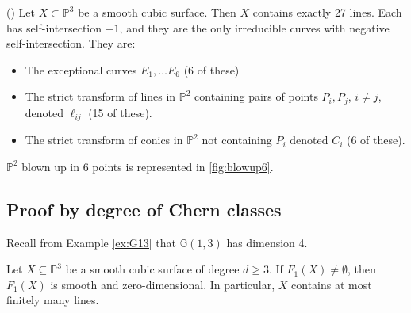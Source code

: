 \begin{proposition}\label{prop:27}
    () Let $X \subset \mathbb{P}^3$ be a smooth cubic surface. Then $X$ contains exactly 27 lines. Each has self-intersection $-1$, and they are the only irreducible curves with negative self-intersection. They are:
    \begin{itemize}
        \item The exceptional curves $E_1, \dots E_6$ (6 of these)
        \item The strict transform of lines in $\mathbb{P}^2$ containing pairs of points $P_i, P_j$, $i \neq j$, denoted $\ell_{ij}$ (15 of these).
        \item The strict transform of conics in $\mathbb{P}^2$ not containing $P_i$ denoted $C_i$ (6 of these).
    \end{itemize}
\end{proposition}

$\mathbb{P}^2$ blown up in 6 points is represented in \cref{fig:blowup6}. 



\subsection{Proof by degree of Chern classes}
Recall from Example \ref{ex:G13} that $\mathbb{G}(1,3)$ has dimension 4.

\begin{proposition}
    Let $X \subseteq \mathbb{P}^3$ be a smooth cubic surface of degree $d \geq 3$. If $F_1(X) \neq \emptyset$, then $F_1(X)$ is smooth and zero-dimensional. In particular, $X$ contains at most finitely many lines.  
\end{proposition}

